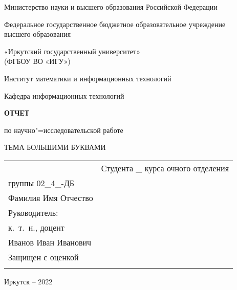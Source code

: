 \documentclass{studrep}
\begin{document}
\thispagestyle{empty}
\begin{center}
Министерство науки и высшего образования Российской Федерации

Федеральное государственное бюджетное образовательное учреждение\\ высшего образования

«Иркутский государственный университет»\\
(ФГБОУ ВО «ИГУ»)

Институт математики и информационных технологий

Кафедра информационных технологий
\end{center}

\vfill
\begin{center}
  \textbf{\large ОТЧЕТ}

  по научно"=исследовательской работе
\vspace{1em}



\vspace{2em}
ТЕМА БОЛЬШИМИ БУКВАМИ

\end{center}
\vfill

\noindent\begin{tabularx}{\textwidth} {
  >{\raggedright\arraybackslash}X
  >{\raggedright}X }
&

Студента \_ курса очного отделения\\
группы 02\_4\_-ДБ\\
Фамилия Имя Отчество\\[2em]

Руководитель:\\
к.~т.~н., доцент\\
\underline{\hspace{3cm}} Иванов Иван Иванович\\[2em]

Защищен с оценкой\\[1em] \underline{\hspace{3cm}}

\end{tabularx}
\vfill
\begin{center}
  Иркутск -- 2022
\end{center}
\clearpage
\end{document}
